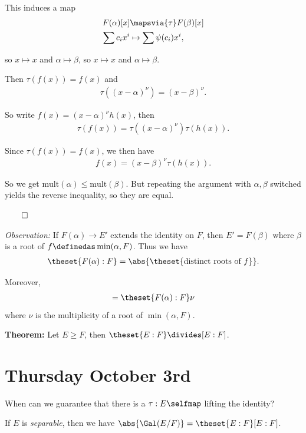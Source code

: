 This induces a map \begin{align*}
F(\alpha)[x] &\mapsvia{\tau} F(\beta)[x] \\
\sum c_i x^i &\mapsto \sum \psi(c_i) x^i
,\end{align*}

so \(x\mapsto x\) and \(\alpha \mapsto \beta\), so \(x\mapsto x\) and
\(\alpha \mapsto \beta\).

Then \(\tau(f(x)) = f(x)\) and
\begin{align*}
\tau((x-\alpha)^\nu) = (x-\beta)^\nu
.\end{align*}

So write \(f(x) = (x-\alpha)^\nu h(x)\), then
\begin{align*}
\tau(f(x)) = \tau((x-\alpha)^\nu) \tau(h(x))
.\end{align*}

Since \(\tau(f(x)) = f(x)\), we then have
\begin{align*}
f(x) = (x-\beta)^\nu \tau(h(x))
.\end{align*}

So we get \(\mathrm{mult}(\alpha) \leq \mathrm{mult}(\beta)\). But
repeating the argument with \(\alpha, \beta\) switched yields the
reverse inequality, so they are equal.

\(\qed\)

\emph{Observation:} If \(F(\alpha) \to E'\) extends the identity on
\(F\), then \(E' = F(\beta)\) where \(\beta\) is a root of
\(f \definedas \min(\alpha, F)\). Thus we have
\begin{align*}
\theset{F(\alpha): F} = \abs{\theset{\text{distinct roots of } f}}
.\end{align*}

Moreover,
\begin{align*}
[F(\alpha): F] = \theset{F(\alpha) : F} \nu
\end{align*} where \(\nu\) is the multiplicity of a root of
\(\min(\alpha, F)\).

\textbf{Theorem:} Let \(E \geq F\), then
\(\theset{E: F} \divides [E: F]\).

\hypertarget{thursday-october-3rd}{%
\section{Thursday October 3rd}\label{thursday-october-3rd}}

When can we guarantee that there is a \(\tau: E\selfmap\) lifting the
identity?

If \(E\) is \emph{separable}, then we have
\(\abs{ \Gal (E/F) } = \theset{E: F} [E: F]\).

